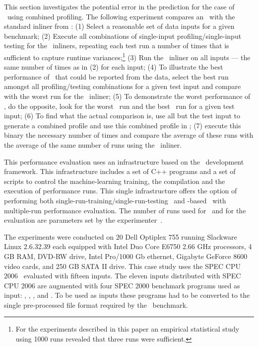 This section investigates the potential error in the prediction for the case of \FDI\ using combined profiling. The following experiment compares an \FDI\ with the standard inliner from \llvm: (1) Select a reasonable set of data inputs for a given benchmark; (2) Execute all combinations of single-input profiling/single-input testing for the \FDO\ inliners, repeating each test run a number of times that is sufficient to capture runtime variances;\footnote{For the experiments described in this paper an empirical statistical study using 1000 runs revealed that three runs were sufficient.}  (3) Run the \llvm\ inliner on all inputs --- the same number of times as in (2) for each input; (4) To illustrate the best performance of \FDI\ that could be reported from the data, select the best run amongst all profiling/testing combinations for a given test input and compare with the worst run for the \llvm\ inliner; (5) To demonstrate the worst performance of \FDI, do the opposite, look for the worst \FDI\ run and the best \llvm\ run for a given test input; (6) To find what the actual comparison is, use all but the test input to generate a combined profile and use this combined profile in \FDI; (7) execute this binary the necessary number of times and compare the average of these runs with the average of the same number of runs using the \llvm\ inliner.



This performance evaluation uses an infrastructure based on the \llvm\ development framework. This infrastructure includes a set of C++ programs and a set of scripts to control the machine-learning training, the compilation and the execution of performance runs. This single infrastructure offers the option of performing both single-run-training/single-run-testing \FDO\ and  \CP-based \FDO\ with multiple-run performance evaluation. The number of runs used for \CP\ and for the evaluation are parameters set by the experimenter~\cite{BerubePhD}.

The experiments were conducted on $20$ Dell Optiplex 755 running Slackware Linux 2.6.32.39 each equipped with Intel Duo Core E6750 2.66 GHz processors, 4 GB RAM, DVD-RW drive, Intel Pro/1000 Gb ethernet, Gigabyte GeForce 8600 video cards, and 250 GB SATA II drive. 
This case study uses the SPEC CPU 2006  \gcc\ evaluated with fifteen inputs. The eleven inputs distributed with SPEC CPU 2006 are augmented with  four SPEC 2000 benchmark programs used as input: \bzip, \lbm, \mcf, and \parser. To be used as inputs these programs had to be converted to the single pre-processed file format required by the \gcc\ benchmark.

